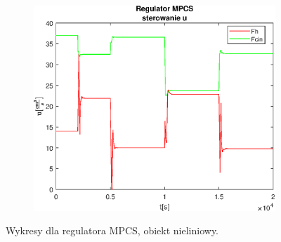 \begin{figure}[h!]
   \begin{subfigure}[b]{0.4\textwidth}
      \includegraphics[width=1\linewidth]{img/MPCSanaRK/MPCSRKControlN500Nu60l40.eps}
      \caption{}
      \label{fig:fig:MPCSRKN500Nu60l403}
   \end{subfigure}
       
   \caption{Wykresy dla regulatora MPCS, obiekt nieliniowy.}
   \label{fig:MPCSRKN500Nu60l40}
\end{figure}
           
